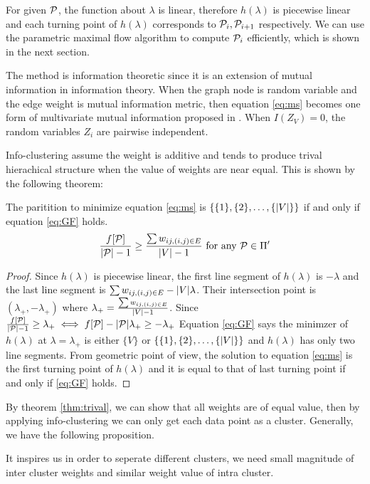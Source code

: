 \documentclass{article}
\begin{document}
For given $\P$, the function about $\lambda$ is linear, therefore $h(\lambda)$ is piecewise linear and each turning point of $h(\lambda)$ corresponds to $\P_i, \P_{i+1}$ respectively. We can use the parametric maximal flow algorithm to compute $\P_i$ efficiently, which is shown in the next section.

The method is information theoretic since it is an extension of mutual information in information theory. When the graph node is random variable and the edge weight is mutual information metric, then equation \eqref{eq:ms} becomes one form of multivariate mutual information proposed in \cite{RN1}. When $I(Z_V)=0$, the random variables $Z_i$ are pairwise independent. 

Info-clustering assume the weight is additive and tends to produce trival hierachical structure when the value of weights are near equal. This is shown by the following theorem:
\begin{theorem}\label{thm:trival}
The paritition to minimize equation \eqref{eq:ms} is $\{\{1\},\{2\},\dots,\{\abs{V}\}\}$ if and only if equation \eqref{eq:GF} holds.
\begin{equation}\label{eq:GF}
\frac{f[\P]}{\abs{\P}-1} \geq \frac{\sum w_{ij, (i,j) \in E}}{\abs{V}-1} \textrm{ for any } \P \in \Pi'
\end{equation}
\end{theorem}
\begin{proof}
Since $h(\lambda)$ is piecewise linear, the first line segment of $h(\lambda)$ is $ - \lambda $ and the last line segment is $ \sum w_{ij, (i,j) \in E} - \abs{V} \lambda$. Their intersection point is $(\lambda_{+}, -\lambda_{+})$ where $\lambda_{+} = \frac{\sum w_{ij, (i,j) \in E}}{\abs{V}-1}$. Since $\frac{f[\P]}{\abs{\P}-1} \geq \lambda_{+} \iff f[\P] - \abs{\P}\lambda_{+} \geq - \lambda_{+}$ Equation \eqref{eq:GF} says the minimzer of $h(\lambda)$ at $\lambda = \lambda_{+}$ is either $\{V\}$ or $\{\{1\},\{2\},\dots,\{\abs{V}\}\}$ and $h(\lambda)$ has only two line segments. From geometric point of view, the solution to equation \eqref{eq:ms} is the first turning point of $h(\lambda)$ and it is equal to that of last turning point if and only if \eqref{eq:GF} holds.
\end{proof}
By theorem \ref{thm:trival}, we can show that all weights are of equal value, then by applying info-clustering we can only get each data point as a cluster. Generally, we have the following proposition.

It inspires us in order to seperate different clusters, we need small magnitude of inter cluster weights and similar weight value of intra cluster.
\end{document}
